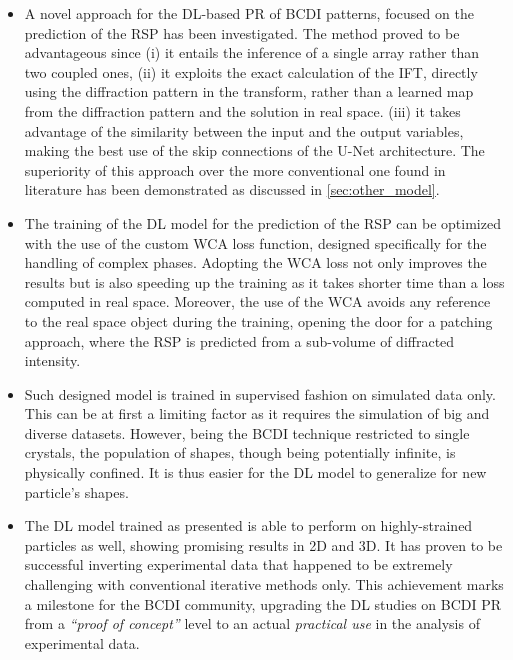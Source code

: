 \begin{itemize}

    \item A novel approach for the DL-based PR of BCDI patterns, focused on the prediction of the RSP has been investigated. 
    The method proved to be advantageous since (i) it entails the inference of a single array rather than two coupled ones, 
    (ii) it exploits the exact calculation of the IFT, directly using the diffraction pattern in the transform, rather than 
    a learned map from the diffraction pattern and the solution in real space. (iii) it takes advantage of the similarity between 
    the input and the output variables, making the best use of the skip connections of the U-Net architecture.
    The superiority of this approach over the more conventional one found in literature has been demonstrated as discussed in 
    \ref{sec:other_model}. 

    \item The training of the DL model for the prediction of the RSP can be optimized with the use of the custom WCA loss function, 
    designed specifically for the handling of complex phases. Adopting the WCA loss not only improves the results but is also 
    speeding up the training as it takes shorter time than a loss computed in real space. Moreover, the use of the WCA avoids 
    any reference to the real space object during the training, opening the door for a patching approach, where the RSP is 
    predicted from a sub-volume of diffracted intensity. 

    \item Such designed model is trained in supervised fashion on simulated data only. This can be at first a limiting factor 
    as it requires the simulation of big and diverse datasets. However, being the BCDI technique restricted to single 
    crystals, the population of shapes, though being potentially infinite, is physically confined. It is thus easier for 
    the DL model to generalize for new particle's shapes. 

    \item The DL model trained as presented is able to perform on highly-strained particles as well, showing promising
    results in 2D and 3D. It has proven to be successful inverting experimental data that happened to be extremely challenging with 
    conventional iterative methods only. This achievement marks a milestone for the BCDI community, upgrading the DL studies
    on BCDI PR from a \textit{``proof of concept''} level to an actual \textit{practical use} in the analysis of experimental data. 


\end{itemize}
